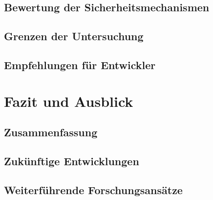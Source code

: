 \subsection{Bewertung der Sicherheitsmechanismen}

\subsection{Grenzen der Untersuchung}

\subsection{Empfehlungen für Entwickler}

\clearpage

\section{Fazit und Ausblick}

\subsection{Zusammenfassung}

\subsection{Zukünftige Entwicklungen}

\subsection{Weiterführende Forschungsansätze}


